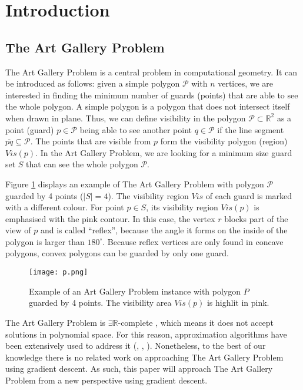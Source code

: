 \section{Introduction}
\subsection{The Art Gallery Problem \cite{o1987art}}

The Art Gallery Problem \cite{o1987art} is a central problem in computational geometry. It can be introduced as follows: given a simple polygon $\mathcal P$ with $n$ vertices, we are interested in finding the minimum number of guards (points) that are able to see the whole polygon. A simple polygon is a polygon that does not intersect itself when drawn in plane. Thus, we can define visibility in the polygon $\mathcal P \subset \mathbb R^2$ as a point (guard) $p \in \mathcal P$ being able to see another point $q \in \mathcal P$ if the line segment $\overline{pq} \subseteq \mathcal P$. The points that are visible from $p$ form the visibility polygon (region) $Vis(p)$. In the Art Gallery Problem, we are looking for a minimum size guard set $S$ that can see the whole polygon $\mathcal P$.

Figure \ref{fig:art} displays an example of The Art Gallery Problem \cite{o1987art} with polygon $\mathcal P$ guarded by 4 points ($|S| = 4$). The visibility region $Vis$ of each guard is marked with a different colour. For point $p \in S$, its visibility region $Vis(p)$ is emphasised with the pink contour. In this case, the vertex $r$ blocks part of the view of $p$ and is called ``reflex'', because the angle it forms on the inside of the polygon is larger than $180^\circ$. Because reflex vertices are only found in concave polygons, convex polygons can be guarded by only one guard.

\begin{figure}[h!]
    \centering
    \texttt{[image: p.png]}
    \caption{Example of an Art Gallery Problem instance with polygon $P$ guarded by 4 points. The visibility area $Vis(p)$ is highlit in pink.}
    \label{fig:art}
\end{figure}

The Art Gallery Problem \cite{o1987art} is $\exists \mathbb R$-complete \cite{abrahamsen2021art}, which means it does not accept solutions in polynomial space. For this reason, approximation algorithms have been extensively used to address it (\cite{DBLP:journals/corr/BonnetM16b}, \cite{GHOSH2010718}, \cite{DBLP:journals/corr/abs-2007-06920}). Nonetheless, to the best of our knowledge there is no related work on approaching The Art Gallery Problem \cite{o1987art} using gradient descent. As such, this paper will approach The Art Gallery Problem \cite{o1987art} from a new perspective using gradient descent.

